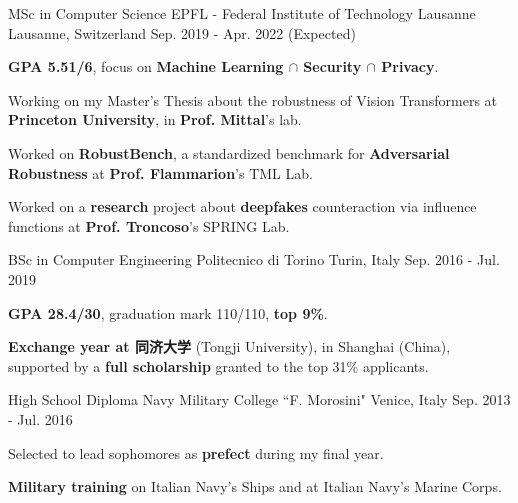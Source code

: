 

\begin{cventries}

  \cventry
  {MSc in Computer Science} %
  {EPFL - Federal Institute of Technology Lausanne} %
  {Lausanne, Switzerland} %
  {Sep. 2019 - Apr. 2022 (Expected)} %
  {
    \begin{cvitems} %
      \item \textbf{GPA 5.51/6}, focus on \textbf{Machine Learning $\cap$ Security $\cap$ Privacy}.
      \item Working on my Master's Thesis about the robustness of Vision Transformers at \textbf{Princeton University}, in \textbf{Prof. Mittal}'s lab.
      \item Worked on \textbf{RobustBench}, a standardized benchmark for \textbf{Adversarial Robustness} at \textbf{Prof. Flammarion}'s TML Lab.
      \item Worked on a \textbf{research} project about \textbf{deepfakes} counteraction via influence functions at \textbf{Prof. Troncoso}'s SPRING Lab.
    \end{cvitems}
  }
  \cventry
  {BSc in Computer Engineering} %
  {Politecnico di Torino} %
  {Turin, Italy} %
  {Sep. 2016 - Jul. 2019} %
  {
    \begin{cvitems} %
      \item \textbf{GPA 28.4/30}, graduation mark 110/110, \textbf{top 9\%}.
      \item \textbf{Exchange year at 同济大学} (Tongji University), in Shanghai (China), supported by a \textbf{full scholarship} granted to the top 31\% applicants. \vspace{0.2cm}
    \end{cvitems}
  }
  \cventry
  {High School Diploma} %
  {Navy Military College ``F. Morosini"} %
  {Venice, Italy} %
  {Sep. 2013 - Jul. 2016} %
  {
    \begin{cvitems} %
      \item Selected to lead sophomores as \textbf{prefect} during my final year.
      \item \textbf{Military training} on Italian Navy's Ships and at Italian Navy's Marine Corps.
    \end{cvitems}
  }

\end{cventries}
